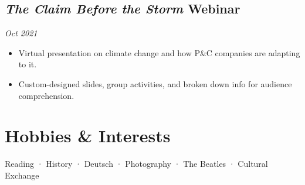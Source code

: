\documentclass[12pt]{article}
\newcommand{\itemspace}{\vspace{0.1870em}}
\begin{document}
\subsection{\textit{The Claim Before the Storm} Webinar} \hfill \textit{Oct 2021}

\begin{itemize}[noitemsep,nolistsep]
  \item Virtual presentation on climate change and how P\&C companies are
    adapting to it.


  \item Custom-designed slides, group activities, and broken down info for
    audience comprehension.
\end{itemize}

\itemspace

\section{Hobbies \& Interests}

Reading · History · Deutsch · Photography · The Beatles · Cultural Exchange
\end{document}
